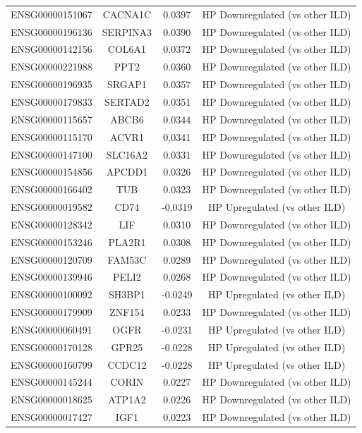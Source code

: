 \documentclass[
]{article}
\begin{document}
\begin{singlespace}
\begin{longtable}[t]{lccc}
ENSG00000151067 & CACNA1C & 0.0397 & HP Downregulated (vs other ILD)\\
ENSG00000196136 & SERPINA3 & 0.0390 & HP Downregulated (vs other ILD)\\
ENSG00000142156 & COL6A1 & 0.0372 & HP Downregulated (vs other ILD)\\
\addlinespace
ENSG00000221988 & PPT2 & 0.0360 & HP Downregulated (vs other ILD)\\
ENSG00000196935 & SRGAP1 & 0.0357 & HP Downregulated (vs other ILD)\\
ENSG00000179833 & SERTAD2 & 0.0351 & HP Downregulated (vs other ILD)\\
ENSG00000115657 & ABCB6 & 0.0344 & HP Downregulated (vs other ILD)\\
ENSG00000115170 & ACVR1 & 0.0341 & HP Downregulated (vs other ILD)\\
\addlinespace
ENSG00000147100 & SLC16A2 & 0.0331 & HP Downregulated (vs other ILD)\\
ENSG00000154856 & APCDD1 & 0.0326 & HP Downregulated (vs other ILD)\\
ENSG00000166402 & TUB & 0.0323 & HP Downregulated (vs other ILD)\\
ENSG00000019582 & CD74 & -0.0319 & HP Upregulated (vs other ILD)\\
ENSG00000128342 & LIF & 0.0310 & HP Downregulated (vs other ILD)\\
\addlinespace
ENSG00000153246 & PLA2R1 & 0.0308 & HP Downregulated (vs other ILD)\\
ENSG00000120709 & FAM53C & 0.0289 & HP Downregulated (vs other ILD)\\
ENSG00000139946 & PELI2 & 0.0268 & HP Downregulated (vs other ILD)\\
ENSG00000100092 & SH3BP1 & -0.0249 & HP Upregulated (vs other ILD)\\
ENSG00000179909 & ZNF154 & 0.0233 & HP Downregulated (vs other ILD)\\
\addlinespace
ENSG00000060491 & OGFR & -0.0231 & HP Upregulated (vs other ILD)\\
ENSG00000170128 & GPR25 & -0.0228 & HP Upregulated (vs other ILD)\\
ENSG00000160799 & CCDC12 & -0.0228 & HP Upregulated (vs other ILD)\\
ENSG00000145244 & CORIN & 0.0227 & HP Downregulated (vs other ILD)\\
ENSG00000018625 & ATP1A2 & 0.0226 & HP Downregulated (vs other ILD)\\
\addlinespace
ENSG00000017427 & IGF1 & 0.0223 & HP Downregulated (vs other ILD)\\

\end{longtable}
\end{singlespace}
\end{document}
